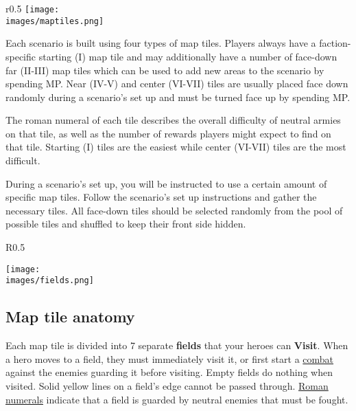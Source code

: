 
\begin{wrapfigure}{r}{0.5\textwidth}
  \texttt{[image: \\images/maptiles.png]}
\end{wrapfigure}

Each scenario is built using four types of map tiles.
Players always have a faction-specific starting (I) map tile and may additionally have a number of face-down far (II-III) map tiles which can be used to add new areas to the scenario by spending MP.
Near (IV-V) and center (VI-VII) tiles are usually placed face down randomly during a scenario’s set up and must be turned face up by spending MP.\par
The roman numeral of each tile describes the overall difficulty of neutral armies on that tile, as well as the number of rewards players might expect to find on that tile.
Starting (I) tiles are the easiest while center (VI-VII) tiles are the most difficult.\par
During a scenario’s set up, you will be instructed to use a certain amount of specific map tiles.
Follow the scenario’s set up instructions and gather the necessary tiles.
All face-down tiles should be selected randomly from the pool of possible tiles and shuffled to keep their front side hidden.\par
\begin{wrapfigure}{R}{0.5\textwidth}
  \begin{center}
  \texttt{[image: \\images/fields.png]}
  \end{center}
\end{wrapfigure}
\subsection*{Map tile anatomy}
Each map tile is divided into 7 separate \textbf{fields} that your heroes can \textbf{Visit}.
When a hero moves to a field, they must immediately visit it, or
first start a \hyperlink{Combat}{combat} against the enemies guarding it before visiting.
Empty fields do nothing when visited.
Solid yellow lines on a field's edge cannot be passed through.
\hyperlink{Difficulty}{Roman numerals} indicate that a field is guarded by neutral enemies that must be fought.\par

\clearpage

